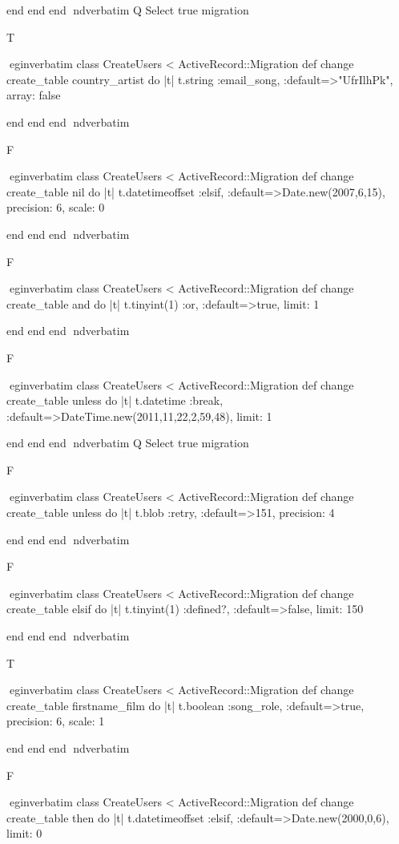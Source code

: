     end 
  end 
end
nd{verbatim}
Q
 Select true migration

T

egin{verbatim}
 class CreateUsers < ActiveRecord::Migration 
  def change 
    create_table country_artist do |t| 
      t.string :email_song, :default=>"UfrIlhPk", array: false
    
    end 
  end 
end
nd{verbatim}

F

egin{verbatim}
 class CreateUsers < ActiveRecord::Migration 
  def change 
    create_table nil do |t| 
      t.datetimeoffset :elsif, :default=>Date.new(2007,6,15), precision: 6, scale: 0
    
    end 
  end 
end
nd{verbatim}

F

egin{verbatim}
 class CreateUsers < ActiveRecord::Migration 
  def change 
    create_table and do |t| 
      t.tinyint(1) :or, :default=>true, limit: 1
    
    end 
  end 
end
nd{verbatim}

F

egin{verbatim}
 class CreateUsers < ActiveRecord::Migration 
  def change 
    create_table unless do |t| 
      t.datetime :break, :default=>DateTime.new(2011,11,22,2,59,48), limit: 1
    
    end 
  end 
end
nd{verbatim}
Q
 Select true migration

F

egin{verbatim}
 class CreateUsers < ActiveRecord::Migration 
  def change 
    create_table unless do |t| 
      t.blob :retry, :default=>151, precision: 4
    
    end 
  end 
end
nd{verbatim}

F

egin{verbatim}
 class CreateUsers < ActiveRecord::Migration 
  def change 
    create_table elsif do |t| 
      t.tinyint(1) :defined?, :default=>false, limit: 150
    
    end 
  end 
end
nd{verbatim}

T

egin{verbatim}
 class CreateUsers < ActiveRecord::Migration 
  def change 
    create_table firstname_film do |t| 
      t.boolean :song_role, :default=>true, precision: 6, scale: 1
    
    end 
  end 
end
nd{verbatim}

F

egin{verbatim}
 class CreateUsers < ActiveRecord::Migration 
  def change 
    create_table then do |t| 
      t.datetimeoffset :elsif, :default=>Date.new(2000,0,6), limit: 0
    
